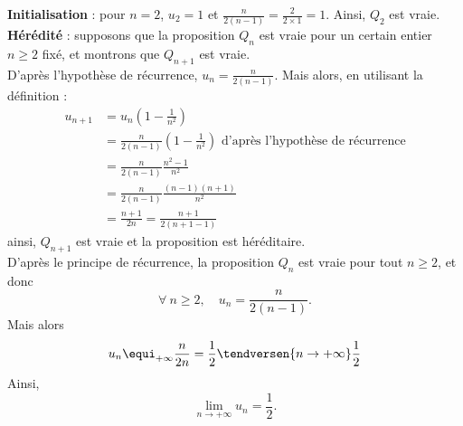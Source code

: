 {{	\textbf{Initialisation} : pour $n=2$, $u_2=1$ et $\frac{n}{2(n-1)}=\frac{2}{2\times 1}=1$. Ainsi, $Q_2$ est vraie.\\
	\textbf{Hérédité} : supposons que la proposition $Q_n$ est vraie pour un certain entier $n\geq 2$ fixé, et montrons que $Q_{n+1}$ est vraie.\\
	D'après l'hypothèse de récurrence, $u_n=\frac{n}{2(n-1)}$. Mais alors, en utilisant la définition :
	\begin{align*}
	  u_{n+1} &= u_n\left(1-\frac{1}{n^2}\right)\\
	  &= \frac{n}{2(n-1)} \left(1-\frac{1}{n^2}\right) \text{ d'après l'hypothèse de récurrence} \\
	  &= \frac{n}{2(n-1)} \frac{n^2-1}{n^2}\\
	  &= \frac{n}{2(n-1)} \frac{(n-1)(n+1)}{n^2}\\
	  &= \frac{n+1}{2n} = \frac{n+1}{2(n+1-1)}	
	\end{align*}
	ainsi, $Q_{n+1}$ est vraie et la proposition est héréditaire.\\D'après le principe de récurrence, la proposition $Q_n$ est vraie pour tout $n\geq 2$, et donc \[ \boxed{\forall~n\geq 2,\quad u_n=\frac{n}{2(n-1)}.}\]
	Mais alors
	\[ u_n \equi_{+\infty} \frac{n}{2n} = \frac{1}{2} \tendversen{n\to+\infty} \frac{1}{2} \]
	Ainsi, \[ \boxed{\lim_{n\to +\infty} u_n=\frac12.}\]}
}
